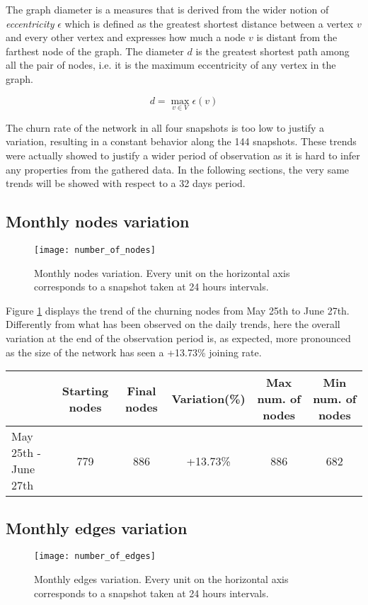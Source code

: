 	The graph diameter is a measures that is derived from the wider notion of \textit{eccentricity} $\epsilon$ which is defined as the greatest shortest distance between a vertex \(v\) and every other vertex and expresses how much a node \(v\) is distant from the farthest node of the graph. The diameter \(d\) is the greatest shortest path among all the pair of nodes, i.e. it is the maximum eccentricity of any vertex in the graph.
	
	\[d = \max_{v \in V} \epsilon(v)\]
	
	The churn rate of the network in all four snapshots is too low to justify a variation, resulting in a constant behavior along the 144 snapshots. These trends were actually showed to justify a wider period of observation as it is hard to infer any properties from the gathered data. In the following sections, the very same trends will be showed with respect to a 32 days period. 

	\subsection{Monthly nodes variation}
	
	\begin{figure}
		\centering
		\texttt{[image: number\_of\_nodes]}
		\caption{Monthly nodes variation. Every unit on the horizontal axis corresponds to a snapshot taken at 24 hours intervals.}
		\label{monthly_nodes}
	\end{figure}
	
	Figure \ref{monthly_nodes} displays the trend of the churning nodes from May 25th to June 27th. Differently from what has been observed on the daily trends, here the overall variation at the end of the observation period is, as expected, more pronounced as the size of the network has seen a +13.73\% joining rate.
	
	\begin{center}
		\begin{tabulary}{\linewidth}{| L | C | C | C | C | C |}
			\hline	
			& Starting nodes & Final nodes  & Variation(\%) & Max num. of nodes & Min num. of nodes \\ \hline
			May 25th - June 27th & 779 & 886 & +13.73\% & 886 & 682 \\ \hline
		\end{tabulary}
	\end{center}
	
	\subsection{Monthly edges variation}
	\begin{figure}
		\centering
		\texttt{[image: number\_of\_edges]}
		\caption{Monthly edges variation. Every unit on the horizontal axis corresponds to a snapshot taken at 24 hours intervals.}
		\label{monthly_edges}
	\end{figure}


